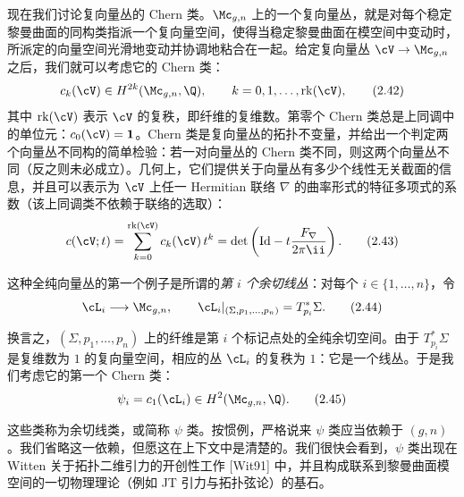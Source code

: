 现在我们讨论复向量丛的 Chern 类。$\Mc_{g,n}$ 上的一个复向量丛，就是对每个稳定黎曼曲面的同构类指派一个复向量空间，使得当稳定黎曼曲面在模空间中变动时，所派定的向量空间光滑地变动并协调地粘合在一起。给定复向量丛 $\cV\to\Mc_{g,n}$ 之后，我们就可以考虑它的 Chern 类：
\begin{equation}
  c_k(\cV)\in H^{2k}(\Mc_{g,n},\Q),\qquad k=0,1,\dots,\operatorname{rk}(\cV),
  \tag{2.42}
\end{equation}
其中 $\operatorname{rk}(\cV)$ 表示 $\cV$ 的复秩，即纤维的复维数。第零个 Chern 类总是上同调中的单位元：$c_0(\cV)=\mathbf{1}$。Chern 类是复向量丛的拓扑不变量，并给出一个判定两个向量丛不同构的简单检验：若一对向量丛的 Chern 类不同，则这两个向量丛不同（反之则未必成立）。几何上，它们提供关于向量丛有多少个线性无关截面的信息，并且可以表示为 $\cV$ 上任一 Hermitian 联络 $\nabla$ 的曲率形式的特征多项式的系数（该上同调类不依赖于联络的选取）：
\begin{equation}
  c(\cV;t)=\sum_{k=0}^{\operatorname{rk}(\cV)}c_k(\cV)\,t^k=\det\left(\mathrm{Id}-t\frac{F_\nabla}{2\pi\ii}\right).
  \tag{2.43}
\end{equation}

这种全纯向量丛的第一个例子是所谓的\emph{第 $i$ 个余切线丛}：对每个 $i\in\{1,\dots,n\}$，令
\begin{equation}
  \cL_i\longrightarrow\Mc_{g,n},\qquad \cL_i|_{(\Sigma,p_1,\dots,p_n)}=T^*_{p_i}\Sigma .
  \tag{2.44}
\end{equation}

换言之，$(\Sigma,p_1,\dots,p_n)$ 上的纤维是第 $i$ 个标记点处的全纯余切空间。由于 $T^*_{p_i}\Sigma$ 是复维数为 $1$ 的复向量空间，相应的丛 $\cL_i$ 的复秩为 $1$：它是一个线丛。于是我们考虑它的第一个 Chern 类：
\begin{equation}
  \psi_i=c_1(\cL_i)\in H^2(\Mc_{g,n},\Q).
  \tag{2.45}
\end{equation}

这些类称为余切线类，或简称 $\psi$ 类。按惯例，严格说来 $\psi$ 类应当依赖于 $(g,n)$。我们省略这一依赖，但愿这在上下文中是清楚的。我们很快会看到，$\psi$ 类出现在 Witten 关于拓扑二维引力的开创性工作 [Wit91] 中，并且构成联系到黎曼曲面模空间的一切物理理论（例如 JT 引力与拓扑弦论）的基石。

